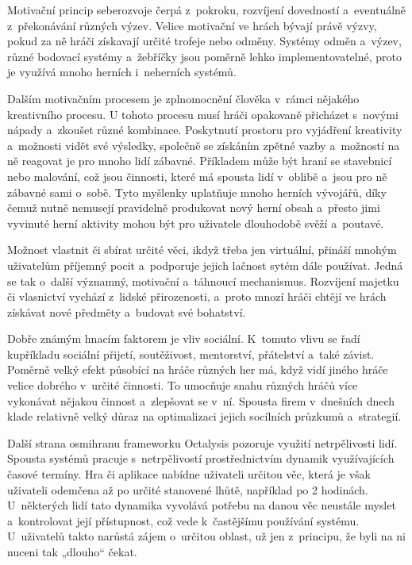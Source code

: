 \documentclass[twoside, 12pt]{article}
\begin{document}
Motivační princip seberozvoje čerpá z~pokroku, rozvíjení dovedností
a~eventuálně z~překonávání různých výzev.
Velice motivační ve hrách bývají právě výzvy,
pokud za ně hráči získavají určité trofeje nebo odměny.
Systémy odměn a~výzev, různé bodovací systémy a~žebříčky
jsou poměrně lehko implementovatelné,
proto je využívá mnoho herních i~neherních systémů.

Dalším motivačním procesem je zplnomocnění člověka v~rámci nějakého kreativního procesu.
U tohoto procesu musí hráči opakovaně přicházet s~novými
nápady a~zkoušet různé kombinace. Poskytnutí prostoru pro vyjádření
kreativity a~možnosti vidět své výsledky, společně se získáním zpětné vazby
a~možností na ně reagovat je pro mnoho lidí zábavné.
Příkladem může být hraní se stavebnicí nebo malování,
což jsou činnosti, které má spousta lidí v~oblibě a~jsou pro ně zábavné sami o~sobě.
Tyto myšlenky uplatňuje mnoho herních vývojářů,
díky čemuž nutně nemusejí pravidelně produkovat nový herní obsah
a~přesto jimi vyvinuté herní aktivity mohou být pro uživatele dlouhodobě svěží a~poutavé.

Možnost vlastnit či sbírat určité věci, ikdyž třeba jen virtuální,
přináší mnohým uživatelům příjemný pocit a~podporuje jejich lačnost
sytém dále používat. Jedná se tak o~další významný, motivační a~táhnoucí mechanismus.
Rozvíjení majetku či vlasnictví vychází z~lidské přirozenosti,
a~proto mnozí hráči chtějí ve hrách získávat nové předměty
a~budovat své bohatství.

Dobře známým hnacím faktorem je vliv sociální.
K~tomuto vlivu se řadí kupříkladu sociální přijetí, soutěživost, mentorství,
přátelství a~také závist. Poměrně velký efekt působící na hráče různých her
má, když vidí jiného hráče velice dobrého v~určité činnosti.
To umocňuje snahu různých hráčů více vykonávat nějakou činnost a~zlepšovat se v~ní.
Spousta firem v~dnešních dnech klade relativně velký důraz na optimalizaci
jejich socílních průzkumů a~strategií.

Další strana osmihranu frameworku Octalysis pozoruje využití
netrpělivosti lidí. Spousta systémů pracuje s~netrpělivostí
prostřednictvím dynamik využívajících časové termíny.
Hra či aplikace nabídne uživateli určitou věc, která je však uživateli
odemčena až po určité stanovené lhůtě, například po 2 hodinách.
U~některých lidí tato dynamika vyvolává potřebu na danou věc neustále myslet
a~kontrolovat její přístupnost, což vede k~častějšímu používání systému.
U~uživatelů takto narůstá zájem o~určitou oblast, už jen z~principu,
že byli na ni nuceni tak „dlouho“ čekat.
\end{document}
